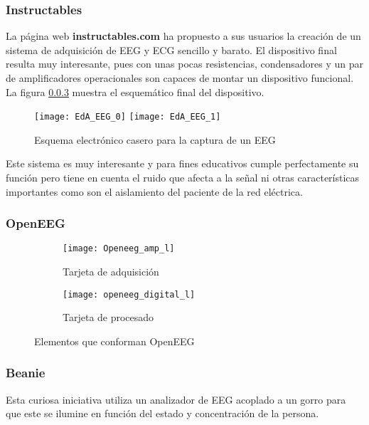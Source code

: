\subsubsection{Instructables}

La página web \textbf{instructables.com} ha propuesto a sus usuarios la creación de un sistema de adquisición de EEG y ECG sencillo y barato. El dispositivo final resulta muy interesante, pues con unas pocas resistencias, condensadores y un par de amplificadores operacionales son capaces de montar un dispositivo funcional. La figura \ref{} muestra el esquemático final del dispositivo.

\begin{figure} [h]
    \centering
    \texttt{[image: EdA\_EEG\_0]}
    \hfill
    \texttt{[image: EdA\_EEG\_1]}
    \caption{Esquema electrónico casero para la captura de un EEG \cite{DIY_EEG}}
    \label{fig:EdA_EEG_1}
\end{figure}

Este sistema es muy interesante y para fines educativos cumple perfectamente su función pero tiene en cuenta el ruido que afecta a la señal ni otras características importantes como son el aislamiento del paciente de la red eléctrica.

\subsubsection{OpenEEG}


\begin{figure}[h]
  \begin{subfigure}[b]{7cm}
   	\centering
    \texttt{[image: Openeeg\_amp\_l]}
    \caption{Tarjeta de adquisición}
    \label{fig:Openeeg_amp_l}
  \end{subfigure}
  \hfill
  \begin{subfigure}[b]{7cm}
  	\centering
    \texttt{[image: openeeg\_digital\_l]}
    \caption{Tarjeta de procesado}
    \label{fig:openeeg_digital_l}
  \end{subfigure}
  \caption{Elementos que conforman OpenEEG}
  \label{fig:OpenEEG}
\end{figure}


\subsubsection{Beanie}

Esta curiosa iniciativa utiliza un analizador de EEG acoplado a un gorro para que este se ilumine en función del estado y concentración de la persona.


